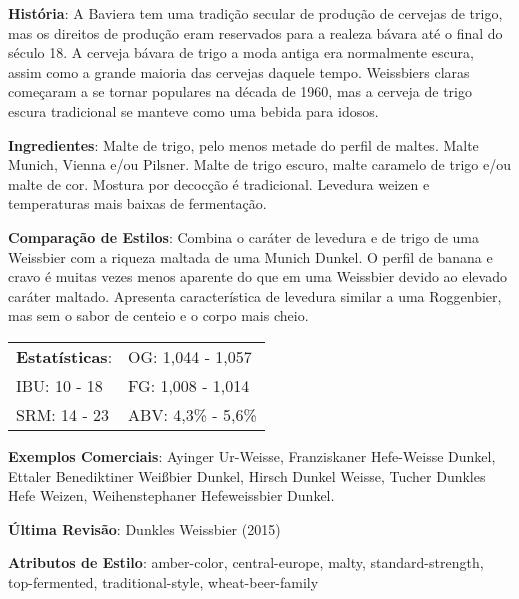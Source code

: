 \textbf{História}: A Baviera tem uma tradição secular de produção de cervejas de trigo, mas os direitos de produção eram reservados para a realeza bávara até o final do século 18. A cerveja bávara de trigo a moda antiga era normalmente escura, assim como a grande maioria das cervejas daquele tempo. Weissbiers claras começaram a se tornar populares na década de 1960, mas a cerveja de trigo escura tradicional se manteve como uma bebida para idosos.

\textbf{Ingredientes}: Malte de trigo, pelo menos metade do perfil de maltes. Malte Munich, Vienna e/ou Pilsner. Malte de trigo escuro, malte caramelo de trigo e/ou malte de cor. Mostura por decocção é tradicional. Levedura weizen e temperaturas mais baixas de fermentação.

\textbf{Comparação de Estilos}: Combina o caráter de levedura e de trigo de uma Weissbier com a riqueza maltada de uma Munich Dunkel. O perfil de banana e cravo é muitas vezes menos aparente do que em uma Weissbier devido ao elevado caráter maltado. Apresenta característica de levedura similar a uma Roggenbier, mas sem o sabor de centeio e o corpo mais cheio.

\begin{tabular}{@{}p{35mm}p{35mm}@{}}
  \textbf{Estatísticas}: & OG: 1,044 - 1,057 \\
  IBU: 10 - 18 & FG: 1,008 - 1,014 \\
  SRM: 14 - 23 & ABV: 4,3\% - 5,6\%
\end{tabular}

\textbf{Exemplos Comerciais}: Ayinger Ur-Weisse, Franziskaner Hefe-Weisse Dunkel, Ettaler Benediktiner Weißbier Dunkel, Hirsch Dunkel Weisse, Tucher Dunkles Hefe Weizen, Weihenstephaner Hefeweissbier Dunkel.

\textbf{Última Revisão}: Dunkles Weissbier (2015)

\textbf{Atributos de Estilo}: amber-color, central-europe, malty, standard-strength, top-fermented, traditional-style, wheat-beer-family
